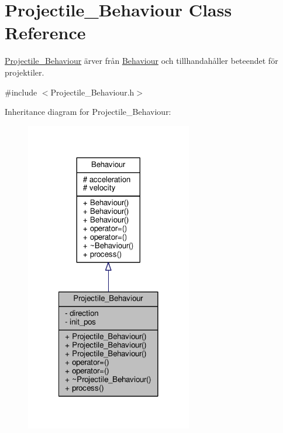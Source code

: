 \hypertarget{classProjectile__Behaviour}{\section{Projectile\+\_\+\+Behaviour Class Reference}
\label{classProjectile__Behaviour}
}


\hyperlink{classProjectile__Behaviour}{Projectile\+\_\+\+Behaviour} ärver från \hyperlink{classBehaviour}{Behaviour} och tillhandahåller beteendet för projektiler.  




{\ttfamily \#include $<$Projectile\+\_\+\+Behaviour.\+h$>$}



Inheritance diagram for Projectile\+\_\+\+Behaviour\+:\nopagebreak
\begin{figure}[H]
\begin{center}
\leavevmode
\includegraphics[width=206pt]{classProjectile__Behaviour__inherit__graph}
\end{center}
\end{figure}


